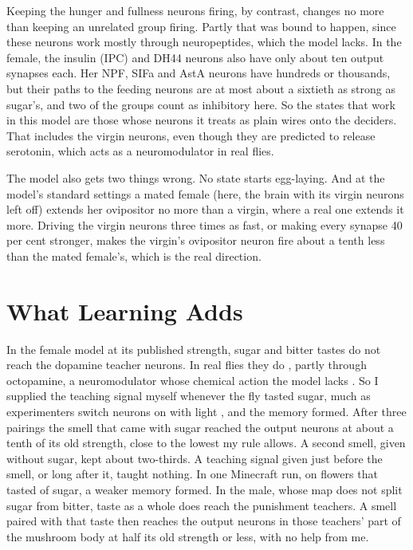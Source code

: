Keeping the hunger and fullness neurons firing, by contrast, changes no more than keeping an unrelated group firing. Partly that was bound to happen, since these neurons work mostly through neuropeptides, which the model lacks. In the female, the insulin (IPC) and DH44 neurons also have only about ten output synapses each. Her NPF, SIFa and AstA neurons have hundreds or thousands, but their paths to the feeding neurons are at most about a sixtieth as strong as sugar's, and two of the groups count as inhibitory here. So the states that work in this model are those whose neurons it treats as plain wires onto the deciders. That includes the virgin neurons, even though they are predicted to release serotonin, which acts as a neuromodulator in real flies.

The model also gets two things wrong. No state starts egg-laying. And at the model's standard settings a mated female (here, the brain with its virgin neurons left off) extends her ovipositor no more than a virgin, where a real one extends it more. Driving the virgin neurons three times as fast, or making every synapse 40 per cent stronger, makes the virgin's ovipositor neuron fire about a tenth less than the mated female's, which is the real direction.

\section{What Learning Adds}
\label{sec:memory}

In the female model at its published strength, sugar and bitter tastes do not reach the dopamine teacher neurons. In real flies they do \citep{liu2012subset}, partly through octopamine, a neuromodulator whose chemical action the model lacks \citep{burke2012layered}. So I supplied the teaching signal myself whenever the fly tasted sugar, much as experimenters switch neurons on with light , and the memory formed. After three pairings the smell that came with sugar reached the output neurons at about a tenth of its old strength, close to the lowest my rule allows. A second smell, given without sugar, kept about two-thirds. A teaching signal given just before the smell, or long after it, taught nothing. In one Minecraft run, on flowers that tasted of sugar, a weaker memory formed. In the male, whose map does not split sugar from bitter, taste as a whole does reach the punishment teachers. A smell paired with that taste then reaches the output neurons in those teachers' part of the mushroom body at half its old strength or less, with no help from me.

